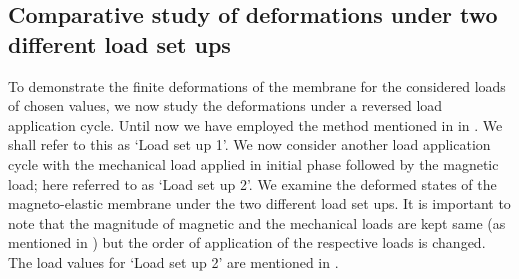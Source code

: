 
\subsection{Comparative study of deformations under two different load set ups}

To demonstrate the finite deformations of the membrane for the considered loads of chosen values, we now study the deformations under a reversed load application cycle. Until now we have employed the method mentioned in  in . We shall refer to this as `Load set up 1'. We now consider another load application cycle with the mechanical load applied in initial phase followed by the magnetic load; here referred to as `Load set up 2'. We examine the deformed states of the magneto-elastic membrane under the two different load set ups. It is important to note that the magnitude of magnetic and the mechanical loads are kept same (as mentioned in ) but the order of application of the respective loads is changed. The load values for `Load set up 2' are mentioned in . \par 

